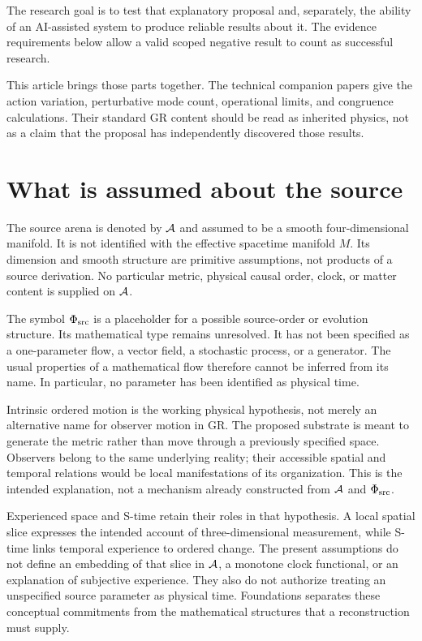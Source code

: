 \documentclass[11pt]{article}
\begin{document}
The research goal is to test that explanatory proposal and, separately, the ability of an AI-assisted system to produce reliable results about it. The evidence requirements below allow a valid scoped negative result to count as successful research.

This article brings those parts together. The technical companion papers give the action variation, perturbative mode count, operational limits, and congruence calculations. Their standard GR content should be read as inherited physics, not as a claim that the proposal has independently discovered those results.

\section{What is assumed about the source}
The source arena is denoted by $\mathcal A$ and assumed to be a smooth four-dimensional manifold. It is not identified with the effective spacetime manifold $M$. Its dimension and smooth structure are primitive assumptions, not products of a source derivation. No particular metric, physical causal order, clock, or matter content is supplied on $\mathcal A$.

The symbol $\Phi_{\mathrm{src}}$ is a placeholder for a possible source-order or evolution structure. Its mathematical type remains unresolved. It has not been specified as a one-parameter flow, a vector field, a stochastic process, or a generator. The usual properties of a mathematical flow therefore cannot be inferred from its name. In particular, no parameter has been identified as physical time.

Intrinsic ordered motion is the working physical hypothesis, not merely an alternative name for observer motion in GR. The proposed substrate is meant to generate the metric rather than move through a previously specified space. Observers belong to the same underlying reality; their accessible spatial and temporal relations would be local manifestations of its organization. This is the intended explanation, not a mechanism already constructed from $\mathcal A$ and $\Phi_{\mathrm{src}}$.

Experienced space and S-time retain their roles in that hypothesis. A local spatial slice expresses the intended account of three-dimensional measurement, while S-time links temporal experience to ordered change. The present assumptions do not define an embedding of that slice in $\mathcal A$, a monotone clock functional, or an explanation of subjective experience. They also do not authorize treating an unspecified source parameter as physical time. Foundations separates these conceptual commitments from the mathematical structures that a reconstruction must supply.
\end{document}
